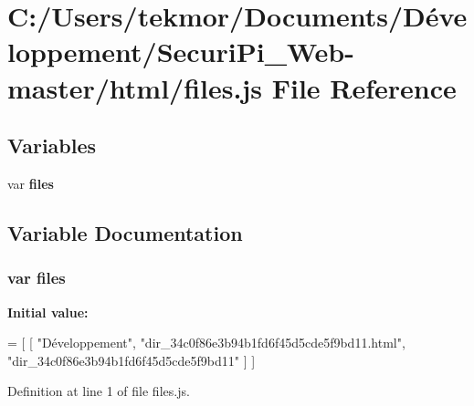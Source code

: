 \section{C\+:/\+Users/tekmor/\+Documents/\+Développement/\+Securi\+Pi\+\_\+\+Web-\/master/html/files.js File Reference}
\label{files_8js}
\subsection*{Variables}
\begin{DoxyCompactItemize}
\item 
var {\bf files}
\end{DoxyCompactItemize}


\subsection{Variable Documentation}
\subsubsection[{files}]{\setlength{\rightskip}{0pt plus 5cm}var files}\label{files_8js_a0742cac2750bccc2d88ac080fb9daa22}
{\bfseries Initial value\+:}
\begin{DoxyCode}
=
[
    [ \textcolor{stringliteral}{"Développement"}, \textcolor{stringliteral}{"dir\_34c0f86e3b94b1fd6f45d5cde5f9bd11.html"}, \textcolor{stringliteral}{"dir\_34c0f86e3b94b1fd6f45d5cde5f9bd11"} 
      ]
]
\end{DoxyCode}


Definition at line 1 of file files.\+js.

